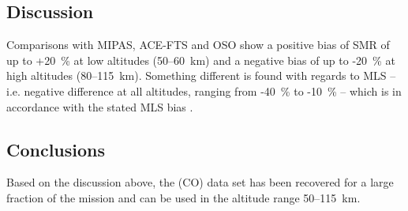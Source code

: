 \subsection{Discussion}
\label{sec:fm22:discussion}
Comparisons with MIPAS, ACE-FTS and OSO show a positive bias of SMR of up to
+20~\% at low altitudes (50--60~km) and a negative bias of up to -20~\% at
high altitudes (80--115~km). Something different is found with regards to MLS
-- i.e. negative difference at all altitudes, ranging from -40~\% to -10~\%
-- which is in accordance with the stated MLS bias \cite{Errera2019}.



\subsection{Conclusions}
\label{sec:fm22:conclusions}
Based on the discussion above, the \chem(CO) data set has been recovered for a large fraction of the mission and can be used in the altitude range 50--115~km.
